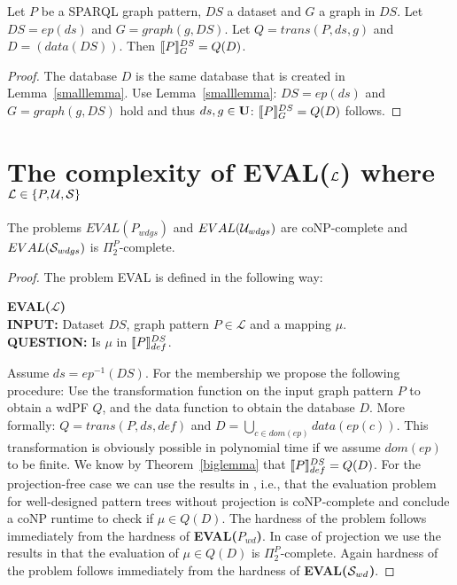 \begin{theorem}\label{biglemma}
	Let $P$ be a SPARQL graph pattern, $DS$ a dataset and $G$ a graph in $DS$.
	Let $DS = ep(ds)$  and $G = graph(g,DS)$. Let $Q = trans(P,ds,g)$ and $D =
	(data(DS))$.	Then $\llbracket P \rrbracket^{DS}_G = Q(D)$.
\end{theorem}
\begin{proof}
	The database $D$ is the same database that is created in
	Lemma~\ref{smalllemma}.
	Use Lemma~\ref{smalllemma}: 
	$DS = ep(ds)$  and $G = graph(g,DS)$ hold and thus $ds,g \in \mathbf{U}$:
	$\llbracket P \rrbracket^{DS}_G = Q(D)$ follows.
\end{proof}

\section{The complexity of EVAL($\mathcal{L}$) where $\mathcal{L} \in \{P,\mathcal{U},\mathcal{S}\}$ }

\begin{corollary}
	The problems $EVAL(P_{wdgs})$ and $EVAL(\mathcal{U}_{wdgs})$ are coNP-complete and
	$EVAL(\mathcal{S}_{wdgs})$ is $\Pi^P_2$-complete.
\end{corollary}
\begin{proof}
The problem EVAL is defined in the following way:
\begin{framed}\noindent \textbf{EVAL($\mathcal{L}$)}\\
	\textbf{INPUT:} Dataset $DS$, graph pattern $P \in  \mathcal{L}$ and a mapping $\mu$.\\
	\textbf{QUESTION:} Is $\mu$ in $\llbracket P \rrbracket^{DS}_{def}$.
\end{framed}
Assume $ds = ep^{-1}(DS)$. %
For the membership we propose the following procedure:
Use the transformation function on the input graph pattern $P$ to obtain a wdPF
$Q$, and the data function to obtain the database $D$. More formally:
$Q = trans(P,ds,def)$ and $D = \bigcup\limits_{c\in dom(ep)} data(ep(c))$. This transformation is obviously
possible in polynomial time if we assume $dom(ep)$ to be finite. We know by Theorem~\ref{biglemma} that 
$\llbracket P \rrbracket^{DS}_{def} = Q(D)$.
For the projection-free case we can use the results in 
\cite{perez2009semantics}, i.e., that the evaluation problem for well-designed
pattern trees without projection is coNP-complete and conclude a coNP runtime to
check if $\mu \in Q(D)$.
The hardness of the problem follows immediately from the hardness of
\textbf{EVAL($P_{wd}$)}.
In case of projection we use the results in \cite{letelier2013static}
that the evaluation of $\mu \in Q(D)$ is $\Pi^P_2$-complete.
Again hardness of the problem follows immediately from the hardness of 
\textbf{EVAL($\mathcal{S}_{wd}$)}.
\end{proof}

